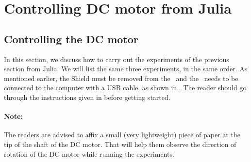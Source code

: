 \section{Controlling DC motor from Julia}
\subsection{Controlling the DC motor}
In this section, we discuss how to carry out the experiments of the
previous section from Julia.  We will list the same three experiments,
in the same order. As mentioned earlier, the Shield must be removed from 
the \arduino\ and the \arduino\ needs to be connected to the computer 
with a USB cable, as shown in . The reader should go through the instructions given in  before getting started.

\paragraph{Note:} The readers are advised to affix a small 
(very lightweight) piece of paper at the tip of the shaft of the DC motor. 
That will help them observe the direction of rotation 
of the DC motor while running the experiments.


